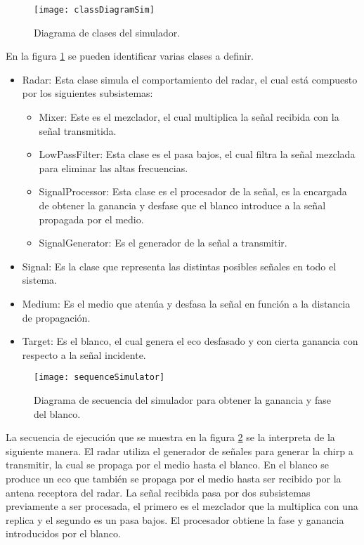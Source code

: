 \begin{figure}[htb]
 \centering
 \texttt{[image: classDiagramSim]}
 \caption{Diagrama de clases del simulador.}
 \label{fig:classDiagramSimulator}
\end{figure}
En la figura \ref{fig:classDiagramSimulator} se pueden identificar varias clases a definir.
\begin{itemize}
  \item Radar: Esta clase simula el comportamiento del radar, el cual está compuesto por los siguientes subsistemas:
  \begin{itemize}
    \item Mixer: Este es el mezclador, el cual multiplica la señal recibida con la señal transmitida.
    \item LowPassFilter: Esta clase es el pasa bajos, el cual filtra la señal mezclada para eliminar las altas frecuencias.
    \item SignalProcessor: Esta clase es el procesador de la señal, es la encargada de obtener la ganancia y desfase que el blanco introduce a la señal propagada por el medio.
    \item SignalGenerator: Es el generador de la señal a transmitir.
  \end{itemize}

  \item Signal: Es la clase que representa las distintas posibles señales en todo el sistema.
  \item Medium: Es el medio que atenúa y desfasa la señal en función a la distancia de propagación.
  \item Target: Es el blanco, el cual genera el eco desfasado y con cierta ganancia con respecto a la señal incidente.
\end{itemize}

\begin{figure}[htb]
 \centering
 \texttt{[image: sequenceSimulator]}
 \caption{Diagrama de secuencia del simulador para obtener la ganancia y fase del blanco.}
 \label{fig:sequenceSimulator}
\end{figure}
La secuencia de ejecución que se muestra en la figura \ref{fig:sequenceSimulator} se la interpreta de la siguiente manera. El radar utiliza el generador de señales para generar la chirp a transmitir, la cual se propaga por el medio hasta el blanco. En el blanco se produce un eco que también se propaga por el medio hasta ser recibido por la antena receptora del radar. La señal recibida pasa por dos subsistemas previamente a ser procesada, el primero es el mezclador que la multiplica con una replica y el segundo es un pasa bajos. El procesador obtiene la fase y ganancia introducidos por el blanco.


